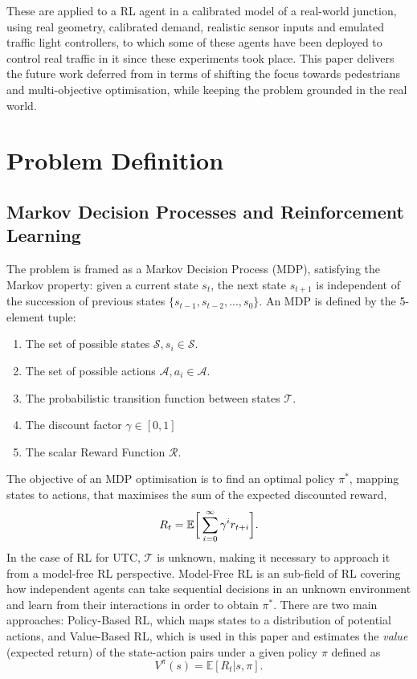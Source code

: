 \documentclass[conference]{IEEEtran}
\begin{document}
These are applied to a RL agent in a calibrated model of a real-world junction, using real geometry, calibrated demand, realistic sensor inputs and emulated traffic light controllers, to which some of these agents have been deployed to control real traffic in it since these experiments took place.
This paper delivers the future work deferred from \cite{previous} in terms of shifting the focus towards pedestrians and multi-objective optimisation, while keeping the problem grounded in the real world.
\section{Problem Definition}
\label{problem}
\subsection{Markov Decision Processes and Reinforcement Learning}
The problem is framed as a Markov Decision Process (MDP), satisfying the Markov property: given a current state $s_t$, the next state $s_{t+1}$ is independent of the succession of previous states $\{s_{t-1}, s_{t-2}, ..., s_0\}$.
An MDP is defined by the 5-element tuple:
\begin{enumerate}
\item The set of possible states $\mathcal{S}, s_i\in \mathcal{S}$.
\item The set of possible actions $\mathcal{A}, a_i\in \mathcal{A}$.
\item The probabilistic transition function between states $\mathcal{T}$.
\item The discount factor $\gamma \in [0,1]$ 
\item The scalar Reward Function $\mathcal{R}$. 
\end{enumerate}

The objective of an MDP optimisation is to find an optimal policy $\pi^*$, mapping states to actions, that maximises the sum of the expected discounted reward,
\begin{equation}
R_t = \mathbb{E} \bigg{[} \sum^{\infty}_{i=0} \gamma^i r_{t+i} \bigg{]} .
\label{eq:reward}
\end{equation}
In the case of RL for UTC, $\mathcal{T}$ is unknown, making it necessary to approach it from a model-free RL perspective.
Model-Free RL is an sub-field of RL covering how independent agents can take sequential decisions in an unknown environment and learn from their interactions in order to obtain $\pi^*$. 
There are two main approaches: Policy-Based RL, which maps states to a distribution of potential actions, and Value-Based RL, which is used in this paper and estimates the {\em value} (expected return) of the state-action pairs under a given policy $\pi$ defined  as
\begin{equation}
V^{\pi}(s) = \mathbb{E} [R_t|s,\pi].
\label{eq:value}
\end{equation}
\end{document}

